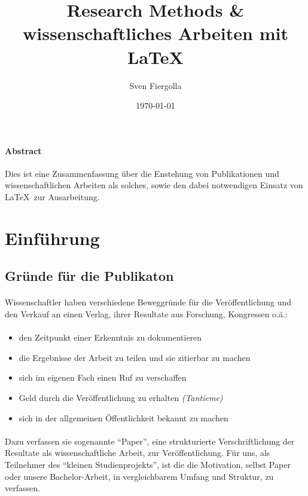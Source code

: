 \documentclass[10pt, a4paper]{article}
\author{Sven Fiergolla}
\title{Research Methods \& wissenschaftliches Arbeiten mit \LaTeX}
\date{\today}
\begin{document}
\maketitle

\paragraph{Abstract}
Dies ist eine Zusammenfassung über die Enstehung von Publikationen und wissenschaftlichen Arbeiten als solches, sowie den dabei notwendigen Einsatz von \LaTeX\  zur Ausarbeitung.
\par
\tableofcontents
\bigskip
\pagebreak %
\par

\section{Einführung}
\subsection{Gründe für die Publikaton}
\paragraph{}
Wissenschaftler haben verschiedene Beweggründe für die Veröffentlichung und den Verkauf an einen Verlag, ihrer Resultate aus Forschung, Kongressen o.ä.:
\par
\paragraph{}
\begin{itemize}
\item den Zeitpunkt einer Erkenntnis zu dokumentieren
\item die Ergebnisse der Arbeit zu teilen und sie zitierbar zu machen
\item sich im eigenen Fach einen Ruf zu verschaffen
\item Geld durch die Veröffentlichung zu erhalten \textit{(Tantieme)}
\item sich in der allgemeinen Öffentlichkeit bekannt zu machen
\end{itemize}
\par
\paragraph{}
Dazu verfassen sie sogenannte \enquote{Paper}, eine strukturierte Verschriftlichung der Resultate als wissenschaftliche Arbeit, zur Veröffentlichung.
Für uns, als Teilnehmer des \enquote{kleinen Studienprojekts}, ist die die Motivation, selbst Paper oder unsere Bachelor-Arbeit, in vergleichbarem Umfang und Struktur, zu verfassen.
\par
\end{document}
